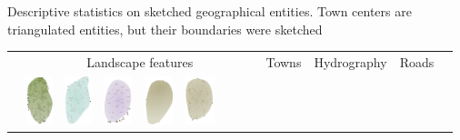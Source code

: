 \documentclass[portrait,a0]{sciposter}
\begin{document}
\begin{minipage}[b]{\textwidth}
\begin{multicols}{3}
    \footnotesize
    \begin{center}
      \captionsetup{type=table}
      \caption{Descriptive statistics on sketched geographical entities. Town centers are triangulated entities, but their boundaries were sketched}\label{tab:stats}
      \setcellgapes{2pt}
      \vspace{-0.2cm}
      \begin{tabular}{l|cccccccc|c|ccccc|c|c}
        & \multicolumn{8}{c|}{Landscape features}
        & Towns
        & \multicolumn{5}{c|}{Hydrography}
        & Roads
        &\\
        &\includegraphics[height=40pt]{gfx/foret_couleur.png}
        &\includegraphics[height=40pt]{gfx/marais_couleur.png}
        &\includegraphics[height=40pt]{gfx/vigne_couleur.png}
        &\includegraphics[height=40pt]{gfx/landes_couleur.png}
        &\includegraphics[height=40pt]{gfx/broussailles_couleur.png}

\end{tabular}
\end{center}
\end{multicols}
\end{minipage}
\end{document}
